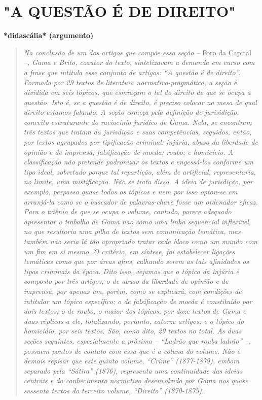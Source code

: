 \part{\texorpdfstring{"\textbf{A QUESTÃO É DE
DIREITO"}}{"A QUESTÃO É DE DIREITO"}}

\textbf{*didascália* (argumento)}

\begin{quote}
\emph{Na conclusão de um dos artigos que compõe essa seção --} Foro da
Capital \emph{--, Gama e Brito, coautor do texto, sintetizavam a demanda
em curso com a frase que intitula esse conjunto de artigos: ``A questão
é de direito''. Formada por 29 textos de literatura
normativo-pragmática, a seção é dividida em seis tópicos, que esmiuçam o
tal do direito de que se ocupa a questão. Isto é, se a questão é de
direito, é preciso colocar na mesa de qual direito estamos falando. A
seção começa pela definição de jurisidição, conceito estruturante do
raciocínio jurídico de Gama. Nela, se encontram três textos que tratam
da jurisdição e suas competências, seguidos, então, por textos agrupados
por tipificação criminal: injúria, abuso da liberdade de opinião e de
imprensa; falsificação de moeda; roubo; e homicício. A classificação não
pretende padronizar os textos e engessá-los conforme um tipo ideal,
sobretudo porque tal repartição, além de artificial, representaria, no
limite, uma mistificação. Não se trata disso. A ideia de jurisdição, por
exemplo, perpassa quase todos os tópicos e nem por isso optou-se em
arranjá-la como se o buscador de palavras-chave fosse um ordenador
eficaz. Para o triênio de que se ocupa o volume, contudo, parece
adequado apresentar o trabalho de Gama não como uma linha sequencial
inflexível, no que resultaria uma pilha de textos sem comunicação
temática, mas também não seria lá tão apropriado tratar cada bloco como
um mundo com um fim em si mesmo. O critério, em síntese, foi estabelecer
ligações temáticas como que por áreas afins, calhando serem as tais
afinidades os tipos criminais da época. Dito isso, vejamos que o tópico
da injúria é composto por três artigos; o de abuso da liberdade de
opinião e de imprensa, por apenas um, porém, como se explicará, com
condições de intitular um tópico específico; o de falsificação de moeda
é constituído por dois textos; o de roubo, o maior dos tópicos, por doze
textos de Gama e duas réplicas a ele, totalizando, portanto, catorze
artigos; e o tópico do homicídio, por seis textos. São, como dito, 29
textos no total. As duas seções seguintes, especialmente a próxima --
``\emph{Ladrão que rouba ladrão}'' --, possuem pontos de contato com
essa que é a coluna do volume. Não é demais repisar que este quinto
volume, ``\emph{Crime}'' (1877-1879), embora separado pela
``\emph{Sátira}'' (1876), representa uma continuidade das ideias
centrais e do conhecimento normativo desenvolvido por Gama nos quase
sessenta textos do terceiro volume, ``\emph{Direito}'' (1870-1875). }
\end{quote}

